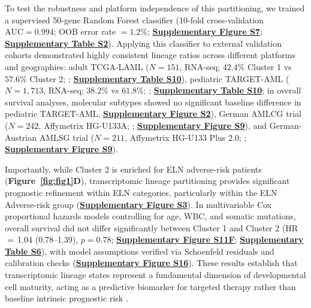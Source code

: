 \documentclass[11pt,a4paper]{article}
\newcommand{\hr}[3]{HR\,$=$\,#1 (#2--#3)}
\begin{document}
To test the robustness and platform independence of this partitioning, we trained a supervised 50-gene Random Forest classifier (10-fold cross-validation $\text{AUC}=0.994$; OOB error rate $=1.2\%$; \textbf{\href{Supplementary_Methods.pdf}{\textbf{Supplementary Figure S7}}}; \href{Supplementary_Methods.pdf}{\textbf{Supplementary Table S2}}). Applying this classifier to external validation cohorts demonstrated highly consistent lineage ratios across different platforms and geographies: adult TCGA-LAML ($N=151$, RNA-seq; $42.4\%$ Cluster 1 vs $57.6\%$ Cluster 2; \cite{cancer2013tcga}; \textbf{\href{Supplementary_Methods.pdf}{\textbf{Supplementary Table S10}}}), pediatric TARGET-AML ($N=1{,}713$, RNA-seq; $38.2\%$ vs $61.8\%$; \cite{bolouri2018target}; \textbf{\href{Supplementary_Methods.pdf}{\textbf{Supplementary Table S10}}}; in overall survival analyses, molecular subtypes showed no significant baseline difference in pediatric TARGET-AML, \textbf{\href{Supplementary_Methods.pdf}{\textbf{Supplementary Figure S2}}}), German AMLCG trial ($N=242$, Affymetrix HG-U133A; \cite{mills2009microarray}; \textbf{\href{Supplementary_Methods.pdf}{\textbf{Supplementary Figure S9}}}), and German-Austrian AMLSG trial ($N=211$, Affymetrix HG-U133 Plus 2.0; \cite{dohner2015aml}; \textbf{\href{Supplementary_Methods.pdf}{\textbf{Supplementary Figure S9}}}).

Importantly, while Cluster 2 is enriched for ELN adverse-risk patients (\textbf{Figure~\ref{fig:fig1}D}), transcriptomic lineage partitioning provides significant prognostic refinement within ELN categories, particularly within the ELN Adverse-risk group (\textbf{\href{Supplementary_Methods.pdf}{\textbf{Supplementary Figure S3}}}). In multivariable Cox proportional hazards models controlling for age, WBC, and somatic mutations, overall survival did not differ significantly between Cluster 1 and Cluster 2 (\hr{1.04}{0.78}{1.39}, $p=0.78$; \textbf{\href{Supplementary_Methods.pdf}{\textbf{Supplementary Figure S11F}}}; \textbf{\href{Supplementary_Methods.pdf}{\textbf{Supplementary Table S6}}}), with model assumptions verified via Schoenfeld residuals and calibration checks (\textbf{\href{Supplementary_Methods.pdf}{\textbf{Supplementary Figure S16}}}). These results establish that transcriptomic lineage states represent a fundamental dimension of developmental cell maturity, acting as a predictive biomarker for targeted therapy rather than baseline intrinsic prognostic risk \cite{ballman2015biomarker}.
\end{document}
